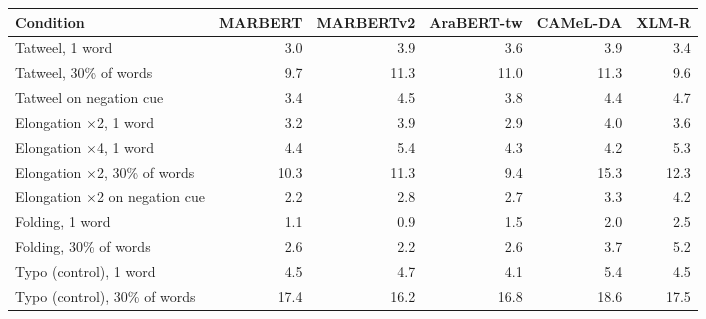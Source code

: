 \begin{tabular}{lrrrrr}
\toprule
Condition & MARBERT & MARBERTv2 & AraBERT-tw & CAMeL-DA & XLM-R \\
\midrule
Tatweel, 1 word & 3.0 & 3.9 & 3.6 & 3.9 & 3.4 \\
Tatweel, 30\% of words & 9.7 & 11.3 & 11.0 & 11.3 & 9.6 \\
Tatweel on negation cue & 3.4 & 4.5 & 3.8 & 4.4 & 4.7 \\
Elongation $\times$2, 1 word & 3.2 & 3.9 & 2.9 & 4.0 & 3.6 \\
Elongation $\times$4, 1 word & 4.4 & 5.4 & 4.3 & 4.2 & 5.3 \\
Elongation $\times$2, 30\% of words & 10.3 & 11.3 & 9.4 & 15.3 & 12.3 \\
Elongation $\times$2 on negation cue & 2.2 & 2.8 & 2.7 & 3.3 & 4.2 \\
Folding, 1 word & 1.1 & 0.9 & 1.5 & 2.0 & 2.5 \\
Folding, 30\% of words & 2.6 & 2.2 & 2.6 & 3.7 & 5.2 \\
Typo (control), 1 word & 4.5 & 4.7 & 4.1 & 5.4 & 4.5 \\
Typo (control), 30\% of words & 17.4 & 16.2 & 16.8 & 18.6 & 17.5 \\
\bottomrule
\end{tabular}

